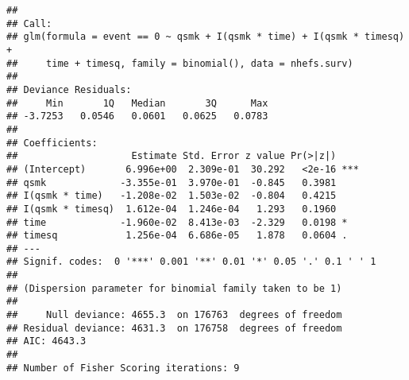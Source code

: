 \documentclass[10pt,]{book}
\begin{document}
\begin{verbatim}
## 
## Call:
## glm(formula = event == 0 ~ qsmk + I(qsmk * time) + I(qsmk * timesq) + 
##     time + timesq, family = binomial(), data = nhefs.surv)
## 
## Deviance Residuals: 
##     Min       1Q   Median       3Q      Max  
## -3.7253   0.0546   0.0601   0.0625   0.0783  
## 
## Coefficients:
##                    Estimate Std. Error z value Pr(>|z|)    
## (Intercept)       6.996e+00  2.309e-01  30.292   <2e-16 ***
## qsmk             -3.355e-01  3.970e-01  -0.845   0.3981    
## I(qsmk * time)   -1.208e-02  1.503e-02  -0.804   0.4215    
## I(qsmk * timesq)  1.612e-04  1.246e-04   1.293   0.1960    
## time             -1.960e-02  8.413e-03  -2.329   0.0198 *  
## timesq            1.256e-04  6.686e-05   1.878   0.0604 .  
## ---
## Signif. codes:  0 '***' 0.001 '**' 0.01 '*' 0.05 '.' 0.1 ' ' 1
## 
## (Dispersion parameter for binomial family taken to be 1)
## 
##     Null deviance: 4655.3  on 176763  degrees of freedom
## Residual deviance: 4631.3  on 176758  degrees of freedom
## AIC: 4643.3
## 
## Number of Fisher Scoring iterations: 9
\end{verbatim}
\end{document}
